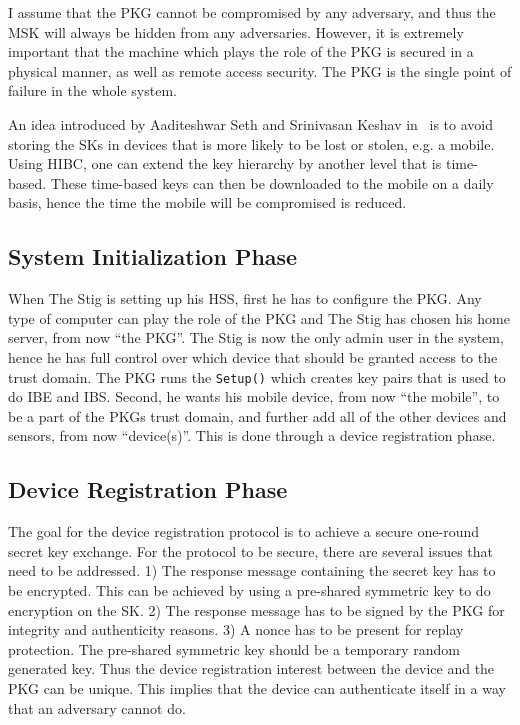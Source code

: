 I assume that the \gls{PKG} cannot be compromised by any adversary, and thus the \gls{MSK} will always be hidden from any adversaries. 
However, it is extremely important that the machine which plays the role of the \gls{PKG} is secured in a physical manner, as well as remote access security. 
The \gls{PKG} is the single point of failure in the whole system.

An idea introduced by Aaditeshwar Seth and Srinivasan Keshav in~\cite[Section 5.4]{Seth:2005:PSD:1897159.1897165} is to avoid storing the \gls{SK}s in devices that is more likely to be lost or stolen, e.g. a mobile.
Using \gls{HIBC}, one can extend the key hierarchy by another level that is time-based.
These time-based keys can then be downloaded to the mobile on a daily basis, hence the time the mobile will be compromised is reduced.

\subsection{System Initialization Phase}
When The Stig is setting up his \gls{HSS}, first he has to configure the \gls{PKG}. 
Any type of computer can play the role of the \gls{PKG} and The Stig has chosen his home server, from now ``the PKG''.
The Stig is now the only admin user in the system, hence he has full control over which device that should be granted access to the trust domain.
The \gls{PKG} runs the \texttt{Setup()} which creates key pairs that is used to do \gls{IBE} and \gls{IBS}.
Second, he wants his mobile device, from now ``the mobile'', to be a part of the \gls{PKG}s trust domain, and further add all of the other devices and sensors, from now ``device(s)''. 
This is done through a device registration phase.

\subsection{Device Registration Phase}\label{init}
The goal for the device registration protocol is to achieve a secure one-round secret key exchange.
For the protocol to be secure, there are several issues that need to be addressed. 
1) The response message containing the secret key has to be encrypted. 
This can be achieved by using a pre-shared symmetric key to do encryption on the \gls{SK}.
2) The response message has to be signed by the \gls{PKG} for integrity and authenticity reasons.
3) A nonce has to be present for replay protection.
The pre-shared symmetric key should be a temporary random generated key. 
Thus the device registration \gls{interest} between the device and the \gls{PKG} can be unique.
This implies that the device can authenticate itself in a way that an adversary cannot do.

